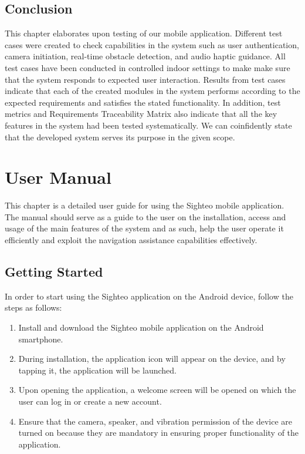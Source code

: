 \documentclass{FastFyp}
\begin{document}
\section{Conclusion}
This chapter elaborates upon testing of our mobile application. Different test cases were created to check capabilities in the system such as user authentication, camera initiation, real-time obstacle detection, and audio haptic guidance. All test cases have been conducted in controlled indoor settings to make make sure that the system responds to expected user interaction. Results from test cases indicate that each of the created modules in the system performs according to the expected requirements and satisfies the stated functionality. In addition, test metrics and Requirements Traceability Matrix also indicate that all the key features in the system had been tested systematically. We can coinfidently state that the developed system serves its purpose in the given scope.



\chapter{User Manual}

This chapter is a detailed user guide for using the Sighteo mobile application. The manual should serve as a guide to the user on the installation, access and usage of the main features of the system and as such, help the user operate it efficiently and exploit the navigation assistance capabilities effectively.

\section{Getting Started}

In order to start using the Sighteo application on the Android device, follow the steps as follows:

\begin{enumerate}
\item Install and download the Sighteo mobile application on the Android smartphone.
\item During installation, the application icon will appear on the device, and by tapping it, the application will be launched.
\item Upon opening the application, a welcome screen will be opened on which the user can log in or create a new account.
\item Ensure that the camera, speaker, and vibration permission of the device are turned on because they are mandatory in ensuring proper functionality of the application.

\end{enumerate}
\end{document}
